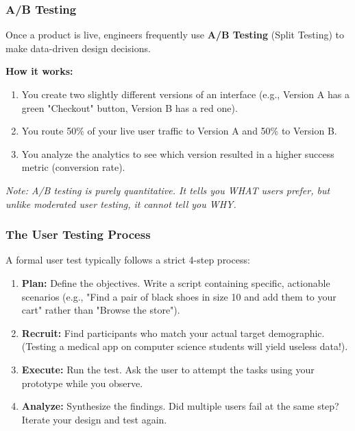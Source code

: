 \documentclass[xcolor=table]{beamer}
\begin{document}
\begin{frame}
    \frametitle{A/B Testing}
    Once a product is live, engineers frequently use \textbf{A/B Testing} (Split Testing) to make data-driven design decisions.
    
    \vspace{0.3cm}
    \textbf{How it works:}
    \begin{enumerate}
        \item You create two slightly different versions of an interface (e.g., Version A has a green "Checkout" button, Version B has a red one).
        \item You route 50\% of your live user traffic to Version A and 50\% to Version B.
        \item You analyze the analytics to see which version resulted in a higher success metric (conversion rate).
    \end{enumerate}
    
    \vspace{0.3cm}
    \textit{Note: A/B testing is purely quantitative. It tells you WHAT users prefer, but unlike moderated user testing, it cannot tell you WHY.}
\end{frame}

\begin{frame}
    \frametitle{The User Testing Process}
    A formal user test typically follows a strict 4-step process:
    
    \begin{enumerate}
        \item \textbf{Plan:} Define the objectives. Write a script containing specific, actionable scenarios (e.g., "Find a pair of black shoes in size 10 and add them to your cart" rather than "Browse the store").
        \item \textbf{Recruit:} Find participants who match your actual target demographic. (Testing a medical app on computer science students will yield useless data!).
        \item \textbf{Execute:} Run the test. Ask the user to attempt the tasks using your prototype while you observe.
        \item \textbf{Analyze:} Synthesize the findings. Did multiple users fail at the same step? Iterate your design and test again.
    \end{enumerate}
\end{frame}
\end{document}
